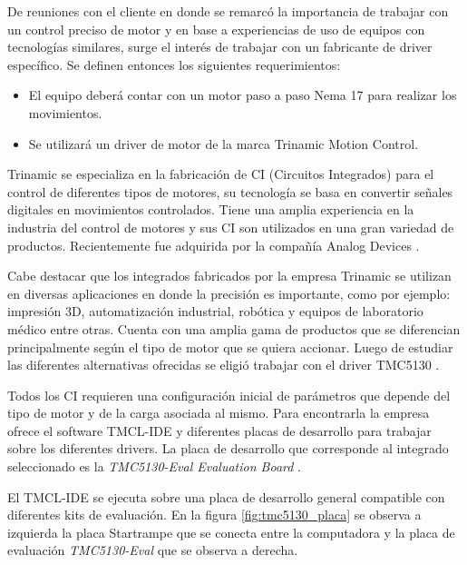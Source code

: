 De reuniones con el cliente en donde se remarcó la importancia de trabajar con un control preciso de motor y en base a experiencias de uso de equipos con tecnologías similares, surge el interés de trabajar con un fabricante de driver específico. Se definen entonces los siguientes requerimientos:
			
\begin{itemize}
\item El equipo deberá contar con un motor paso a paso Nema 17 \citep{web_nema17}  para realizar los movimientos.
\item Se utilizará un driver de motor de la marca Trinamic Motion Control.
\end{itemize}

Trinamic \citep{3_web_trinamic} se especializa en la fabricación de CI (Circuitos Integrados) para el control de diferentes tipos de motores, su tecnología se basa en convertir señales digitales en movimientos controlados. Tiene una amplia experiencia en la industria del control de motores y sus CI son utilizados en una gran variedad de productos. Recientemente fue adquirida por la compañía Analog Devices \citep{web_analogdevices}.

Cabe destacar que los integrados fabricados por la empresa Trinamic se utilizan en diversas aplicaciones en donde la precisión es importante, como por ejemplo: impresión 3D, automatización industrial, robótica y equipos de laboratorio médico entre otras.
Cuenta con una amplia gama de productos que se diferencian principalmente según el tipo de motor que se quiera accionar. Luego de estudiar las diferentes alternativas ofrecidas se eligió trabajar con el driver TMC5130 \citep{3_web_trinamic_producto}.
  
Todos los CI requieren una configuración inicial de parámetros que depende del tipo de motor y de la carga asociada al mismo. Para encontrarla la empresa ofrece el software TMCL-IDE y diferentes placas de desarrollo para trabajar sobre los diferentes drivers. La placa de desarrollo que corresponde al integrado seleccionado es la \textit{TMC5130-Eval Evaluation Board} \citep{3_web_trinamic_placa}.

El TMCL-IDE se ejecuta sobre una placa de desarrollo general compatible con diferentes kits de evaluación. En la figura \ref{fig:tmc5130_placa} se observa a izquierda la placa Startrampe  que se conecta entre la computadora y la placa de evaluación \textit{TMC5130-Eval} que se observa a derecha. 

